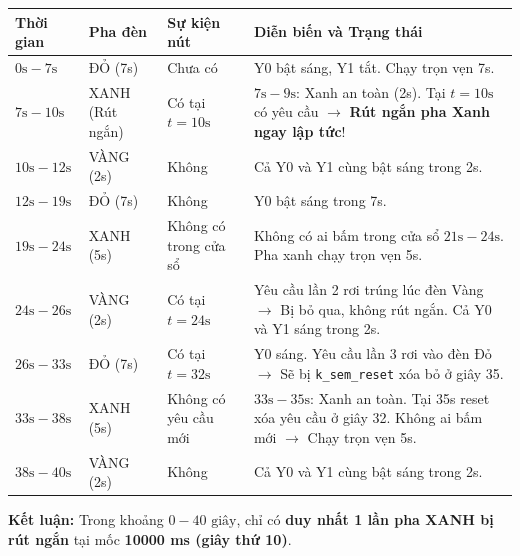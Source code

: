 \begin{enumerate}[label=(\alph*)]
    \vspace{0.2cm}
    \small
    \begin{tabularx}{\linewidth}{|>{\centering\arraybackslash}p{2cm}|>{\centering\arraybackslash}p{1.9cm}|>{\centering\arraybackslash}p{2.1cm}|X|}
    \hline
    \textbf{Thời gian} & \textbf{Pha đèn} & \textbf{Sự kiện nút} & \textbf{Diễn biến và Trạng thái} \\
    \hline
    $0\text{s} - 7\text{s}$ & ĐỎ (7s) & Chưa có & Y0 bật sáng, Y1 tắt. Chạy trọn vẹn 7s. \\
    \hline
    $7\text{s} - 10\text{s}$ & XANH (Rút ngắn) & Có tại $t=10\text{s}$ & $7\text{s}-9\text{s}$: Xanh an toàn (2s). Tại $t=10\text{s}$ có yêu cầu $\rightarrow$ \textbf{Rút ngắn pha Xanh ngay lập tức}! \\
    \hline
    $10\text{s} - 12\text{s}$ & VÀNG (2s) & Không & Cả Y0 và Y1 cùng bật sáng trong 2s. \\
    \hline
    $12\text{s} - 19\text{s}$ & ĐỎ (7s) & Không & Y0 bật sáng trong 7s. \\
    \hline
    $19\text{s} - 24\text{s}$ & XANH (5s) & Không có trong cửa sổ & Không có ai bấm trong cửa sổ $21\text{s}-24\text{s}$. Pha xanh chạy trọn vẹn 5s. \\
    \hline
    $24\text{s} - 26\text{s}$ & VÀNG (2s) & Có tại $t=24\text{s}$ & Yêu cầu lần 2 rơi trúng lúc đèn Vàng $\rightarrow$ Bị bỏ qua, không rút ngắn. Cả Y0 và Y1 sáng trong 2s. \\
    \hline
    $26\text{s} - 33\text{s}$ & ĐỎ (7s) & Có tại $t=32\text{s}$ & Y0 sáng. Yêu cầu lần 3 rơi vào đèn Đỏ $\rightarrow$ Sẽ bị \texttt{k\_sem\_reset} xóa bỏ ở giây 35. \\
    \hline
    $33\text{s} - 38\text{s}$ & XANH (5s) & Không có yêu cầu mới & $33\text{s}-35\text{s}$: Xanh an toàn. Tại 35s reset xóa yêu cầu ở giây 32. Không ai bấm mới $\rightarrow$ Chạy trọn vẹn 5s. \\
    \hline
    $38\text{s} - 40\text{s}$ & VÀNG (2s) & Không & Cả Y0 và Y1 cùng bật sáng trong 2s. \\
    \hline
    \end{tabularx}

    \vspace{0.2cm}
    \noindent\textbf{Kết luận:} Trong khoảng $0 - 40\text{ giây}$, chỉ có \textbf{duy nhất 1 lần pha XANH bị rút ngắn} tại mốc \textbf{10000 ms (giây thứ 10)}.
\end{enumerate}
